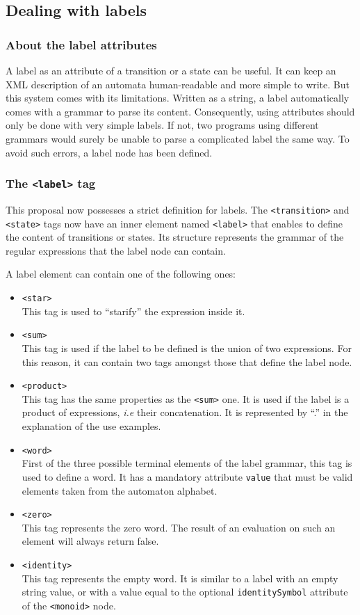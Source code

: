 \documentclass[a4paper]{article}
\newcommand{\xtag}[1]{\texttt{<#1>}}
\newcommand{\xattr}[1]{\texttt{#1}}
\begin{document}
\subsection{Dealing with labels}
\subsubsection{About the label attributes}

A label as an attribute of a transition or a state can be useful. It can keep an
XML description of an automata human-readable and more simple to write. But this
system comes with its limitations. Written as a string, a label automatically
comes with a grammar to parse its content. Consequently, using attributes should
only be done with very simple labels. If not, two programs using different
grammars would surely be unable to parse a complicated label the same way.
To avoid such errors, a label node has been defined.

\subsubsection{The \xtag{label} tag}

This proposal now possesses a strict definition for labels. The \xtag{transition}
and \xtag{state} tags now have an inner element named \xtag{label} that enables to
define the content of transitions or states. Its structure represents the
grammar of the regular expressions that the label node can contain.

A label element can contain one of the following ones:
\begin{itemize}
\item \xtag{star}\\
  This tag is used to ``starify'' the expression inside it.
\item \xtag{sum}\\
  This tag is used if the label to be defined is the union of two
  expressions. For this reason, it can contain two tags amongst those that
  define the label node.
\item \xtag{product}\\
  This tag has the same properties as the \xtag{sum} one. It is used if the label
  is a product of expressions, \textit{i.e} their concatenation. It is
  represented by ``.'' in the explanation of the use examples.
\item \xtag{word}\\
  First of the three possible terminal elements of the label grammar, this tag
  is used to define a word. It has a mandatory attribute \xattr{value} that must
  be valid elements taken from the automaton alphabet.
\item \xtag{zero}\\
  This tag represents the zero word. The result of an evaluation on such an
  element will always return false.
\item \xtag{identity}\\
  This tag represents the empty word. It is similar to a label with an empty
  string value, or with a value equal to the optional \xattr{identitySymbol}
  attribute of the \xtag{monoid} node.
\end{itemize}
\end{document}
